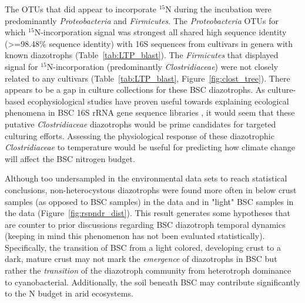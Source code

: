 The OTUs that did appear to incorporate $^{15}$N during the incubation were
predominantly \textit{Proteobacteria} and \textit{Firmicutes}. The
\textit{Proteobacteria} OTUs for which $^{15}$N-incorporation signal was
strongest all shared high sequence identity (\textgreater=98.48\% sequence
identity) with 16S sequences from cultivars in genera with known diazotrophs
(Table~\ref{tab:LTP_blast}). The
\textit{Firmicutes} that displayed signal for $^{15}$N-incorporation (predominantly
\textit{Clostridiaceae}) were not closely related to any cultivars
(Table~\ref{tab:LTP_blast}, Figure~\ref{fig:clost_tree}). There appears to be a
gap in culture collections for these BSC diazotrophs. As culture-based
ecophysiological studies have proven useful towards explaining ecological
phenomena in BSC 16S rRNA gene sequence libraries \citep{Garcia_Pichel_2013},
it would seem that these putative \textit{Clostridiaceae} diazotrophs would be
prime candidates for targeted culturing efforts. Assessing the physiological
response of these diazotrophic \textit{Clostridiaceae} to temperature would be
useful for predicting how climate change will affect the BSC nitrogen
budget. 

Although too undersampled in the environmental data sets to reach statistical
conclusions, non-heterocystous diazotrophs were found more often in below crust
samples (as opposed to BSC samples) in the \citet{Steven_2013} data and in
"light" BSC samples in the \citet{Garcia_Pichel_2013} data
(Figure~\ref{fig:rspndr_dist}). This result generates some hypotheses that are
counter to prior discussions regarding BSC diazotroph temporal dynamics (keeping
in mind this phenomenon has not been evaluated statistically). Specifically,
the transition of BSC from a light colored, developing crust to a dark, mature
crust may not mark the \textit{emergence} of diazotrophs in BSC but rather the 
\textit{transition} of the diazotroph community from heterotroph dominance to
cyanobacterial.  Additionally, the soil beneath BSC may contribute
significantly to the N budget in arid ecosystems.

